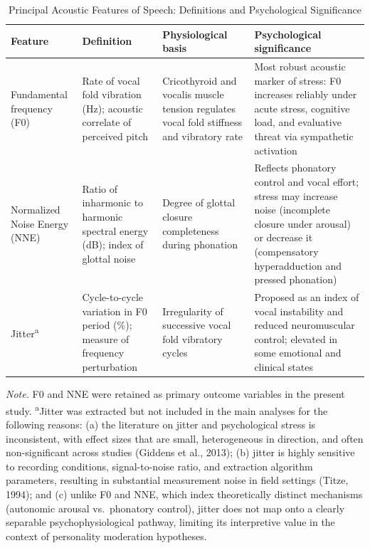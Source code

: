\documentclass[
  english,
  man]{apa6}
\begin{document}
\begin{table}[p]
\centering
\caption{Principal Acoustic Features of Speech: Definitions and Psychological Significance}
\label{tab:acoustic-features}
\begin{threeparttable}
\scriptsize
\begin{tabular}{p{2.4cm} p{3.2cm} p{2.6cm} p{3.0cm}}
\hline
Feature & Definition & Physiological basis & Psychological significance \\
\hline
Fundamental frequency (F0) & Rate of vocal fold vibration (Hz); acoustic correlate of perceived pitch & 
Cricothyroid and vocalis muscle tension regulates vocal fold stiffness and vibratory rate & 
Most robust acoustic marker of stress: F0 increases reliably under acute stress, cognitive load, and evaluative threat via sympathetic activation \\[4pt]

Normalized Noise Energy (NNE) & Ratio of inharmonic to harmonic spectral energy (dB); index of glottal noise & 
Degree of glottal closure completeness during phonation & 
Reflects phonatory control and vocal effort; stress may increase noise (incomplete closure under arousal) or decrease it (compensatory hyperadduction and pressed phonation) \\[4pt]

Jitter\textsuperscript{a} & Cycle-to-cycle variation in F0 period (\%); measure of frequency perturbation & 
Irregularity of successive vocal fold vibratory cycles & 
Proposed as an index of vocal instability and reduced neuromuscular control; elevated in some emotional and clinical states \\
\hline
\end{tabular}

\begin{tablenotes}
\footnotesize
\item \textit{Note.} F0 and NNE were retained as primary outcome variables in the present study. 
\textsuperscript{a}Jitter was extracted but not included in the main analyses for the following reasons: 
(a) the literature on jitter and psychological stress is inconsistent, with effect sizes that are small, heterogeneous in direction, and often non-significant across studies (Giddens et al., 2013); 
(b) jitter is highly sensitive to recording conditions, signal-to-noise ratio, and extraction algorithm parameters, resulting in substantial measurement noise in field settings (Titze, 1994); and 
(c) unlike F0 and NNE, which index theoretically distinct mechanisms (autonomic arousal vs.\ phonatory control), jitter does not map onto a clearly separable psychophysiological pathway, limiting its interpretive value in the context of personality moderation hypotheses.
\end{tablenotes}
\end{threeparttable}
\end{table}
\end{document}
